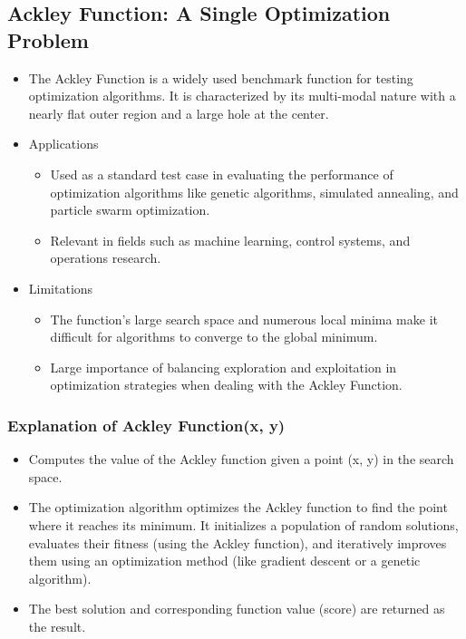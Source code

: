 \documentclass[
  letterpaper,
  DIV=11,
  numbers=noendperiod]{scrreprt}
\providecommand{\tightlist}{%
  \setlength{\itemsep}{0pt}\setlength{\parskip}{0pt}}\usepackage{longtable,booktabs,array}
\begin{document}
\subsection{Ackley Function: A Single Optimization
Problem}\label{ackley-function-a-single-optimization-problem}

\begin{itemize}
\tightlist
\item
  The Ackley Function is a widely used benchmark function for testing
  optimization algorithms. It is characterized by its multi-modal nature
  with a nearly flat outer region and a large hole at the center.
\item
  Applications

  \begin{itemize}
  \tightlist
  \item
    Used as a standard test case in evaluating the performance of
    optimization algorithms like genetic algorithms, simulated
    annealing, and particle swarm optimization.
  \item
    Relevant in fields such as machine learning, control systems, and
    operations research.
  \end{itemize}
\item
  Limitations

  \begin{itemize}
  \tightlist
  \item
    The function's large search space and numerous local minima make it
    difficult for algorithms to converge to the global minimum.
  \item
    Large importance of balancing exploration and exploitation in
    optimization strategies when dealing with the Ackley Function.
  \end{itemize}
\end{itemize}

\subsubsection{Explanation of Ackley Function(x,
y)}\label{explanation-of-ackley-functionx-y}

\begin{itemize}
\tightlist
\item
  Computes the value of the Ackley function given a point (x, y) in the
  search space.
\item
  The optimization algorithm optimizes the Ackley function to find the
  point where it reaches its minimum. It initializes a population of
  random solutions, evaluates their fitness (using the Ackley function),
  and iteratively improves them using an optimization method (like
  gradient descent or a genetic algorithm).
\item
  The best solution and corresponding function value (score) are
  returned as the result.
\end{itemize}
\end{document}
